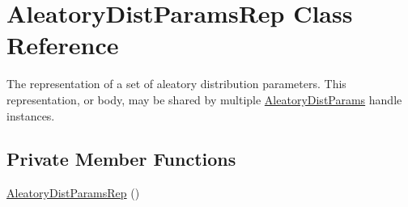 \section{Aleatory\+Dist\+Params\+Rep Class Reference}
\label{classPecos_1_1AleatoryDistParamsRep}


The representation of a set of aleatory distribution parameters. This representation, or body, may be shared by multiple \hyperlink{classPecos_1_1AleatoryDistParams}{Aleatory\+Dist\+Params} handle instances.  


\subsection*{Private Member Functions}
\begin{DoxyCompactItemize}
\item 
\hyperlink{classPecos_1_1AleatoryDistParamsRep_af8f6438a3957c24d33fef5046a43e3ab}{Aleatory\+Dist\+Params\+Rep} ()\label{classPecos_1_1AleatoryDistParamsRep_af8f6438a3957c24d33fef5046a43e3ab}


\end{DoxyCompactItemize}
